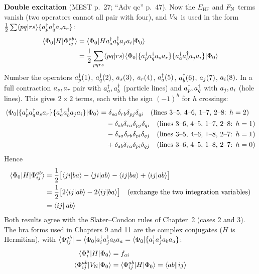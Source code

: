 \textbf{Double excitation} (MEST p.~27; “Adv qc” p.~47). Now the $E_{\text{HF}}$ and $F_{\mathrm{N}}$ terms vanish (two operators cannot all pair with four), and $V_{\mathrm{N}}$ is used in the form $\frac{1}{2} \sum \langle pq\vert rs\rangle \{a^{\dagger}_{p} a^{\dagger}_{q} a_{s} a_{r}\}$:
\begin{align*}
\langle \Phi_0|H|\Phi_{ij}^{ab}\rangle &= \langle \Phi_0|H a^{\dagger}_{a} a^{\dagger}_{b} a_{j} a_{i}|\Phi_0\rangle \\
&= \frac{1}{2} \sum_{pqrs} \langle pq\vert rs\rangle \langle \Phi_0|\{a^{\dagger}_{p} a^{\dagger}_{q} a_{s} a_{r}\} \{a^{\dagger}_{a} a^{\dagger}_{b} a_{j} a_{i}\}|\Phi_0\rangle
\end{align*}
Number the operators $a^{\dagger}_{p} (1)$, $a^{\dagger}_{q} (2)$, $a_{s} (3)$, $a_{r} (4)$, $a^{\dagger}_{a} (5)$, $a^{\dagger}_{b} (6)$, $a_{j} (7)$, $a_{i} (8)$. In a full contraction $a_{s}, a_{r}$ pair with $a^{\dagger}_{a}, a^{\dagger}_{b}$ (particle lines) and $a^{\dagger}_{p}, a^{\dagger}_{q}$ with $a_{j}, a_{i}$ (hole lines). This gives $2 \times 2$ terms, each with the sign $(-1)^h$ for $h$ crossings:
\begin{align*}
\langle \Phi_0|\{a^{\dagger}_{p} a^{\dagger}_{q} a_{s} a_{r}\} \{a^{\dagger}_{a} a^{\dagger}_{b} a_{j} a_{i}\}|\Phi_0\rangle &= \delta_{sa} \delta_{rb} \delta_{pj} \delta_{qi} \quad\text{(lines 3--5, 4--6, 1--7, 2--8: $h = 2$)} \\
&\quad - \delta_{sb} \delta_{ra} \delta_{pj} \delta_{qi} \quad\text{(lines 3--6, 4--5, 1--7, 2--8: $h = 1$)} \\
&\quad - \delta_{sa} \delta_{rb} \delta_{pi} \delta_{qj} \quad\text{(lines 3--5, 4--6, 1--8, 2--7: $h = 1$)} \\
&\quad + \delta_{sb} \delta_{ra} \delta_{pi} \delta_{qj} \quad\text{(lines 3--6, 4--5, 1--8, 2--7: $h = 0$)}
\end{align*}
Hence
\begin{align*}
\langle \Phi_0|H|\Phi_{ij}^{ab}\rangle &= \frac{1}{2} \big[ \langle ji\vert ba\rangle - \langle ji\vert ab\rangle - \langle ij\vert ba\rangle + \langle ij\vert ab\rangle \big] \\
&= \frac{1}{2} \big[ 2 \langle ij\vert ab\rangle - 2 \langle ij\vert ba\rangle \big] \quad\text{(exchange the two integration variables)} \\
&= \langle ij\Vert ab\rangle
\end{align*}
Both results agree with the Slater--Condon rules of Chapter~2 (cases 2 and 3). The bra forms used in Chapters 9 and 11 are the complex conjugates ($H$ is Hermitian), with $\langle \Phi_{ij}^{ab}| = \langle \Phi_0|a^{\dagger}_{i} a^{\dagger}_{j} a_{b} a_{a} = \langle \Phi_0|\{a^{\dagger}_{i} a^{\dagger}_{j} a_{b} a_{a}\}$:
\begin{align*}
\langle \Phi_i^a|H|\Phi_0\rangle &= f_{ai} \\
\langle \Phi_{ij}^{ab}|V_{\mathrm{N}}|\Phi_0\rangle &= \langle \Phi_{ij}^{ab}|H|\Phi_0\rangle = \langle ab\Vert ij\rangle
\end{align*}

